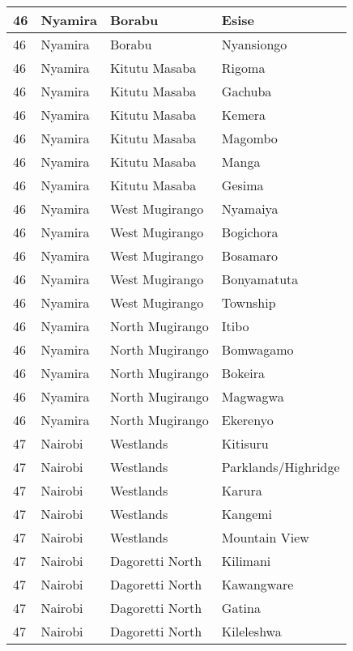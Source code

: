 \begin{table}[!ht]
\begin{tabular}{|l|l|l|l|}
        46 & Nyamira & Borabu & Esise \\ \hline
        46 & Nyamira & Borabu & Nyansiongo \\ \hline
        46 & Nyamira & Kitutu Masaba & Rigoma \\ \hline
        46 & Nyamira & Kitutu Masaba & Gachuba \\ \hline
        46 & Nyamira & Kitutu Masaba & Kemera \\ \hline
        46 & Nyamira & Kitutu Masaba & Magombo \\ \hline
        46 & Nyamira & Kitutu Masaba & Manga \\ \hline
        46 & Nyamira & Kitutu Masaba & Gesima \\ \hline
        46 & Nyamira & West Mugirango & Nyamaiya \\ \hline
        46 & Nyamira & West Mugirango & Bogichora \\ \hline
        46 & Nyamira & West Mugirango & Bosamaro \\ \hline
        46 & Nyamira & West Mugirango & Bonyamatuta \\ \hline
        46 & Nyamira & West Mugirango & Township \\ \hline
        46 & Nyamira & North Mugirango & Itibo \\ \hline
        46 & Nyamira & North Mugirango & Bomwagamo \\ \hline
        46 & Nyamira & North Mugirango & Bokeira \\ \hline
        46 & Nyamira & North Mugirango & Magwagwa \\ \hline
        46 & Nyamira & North Mugirango & Ekerenyo \\ \hline
        47 & Nairobi & Westlands & Kitisuru \\ \hline
        47 & Nairobi & Westlands & Parklands/Highridge \\ \hline
        47 & Nairobi & Westlands & Karura \\ \hline
        47 & Nairobi & Westlands & Kangemi \\ \hline
        47 & Nairobi & Westlands & Mountain View \\ \hline
        47 & Nairobi & Dagoretti North & Kilimani \\ \hline
        47 & Nairobi & Dagoretti North & Kawangware \\ \hline
        47 & Nairobi & Dagoretti North & Gatina \\ \hline
        47 & Nairobi & Dagoretti North & Kileleshwa \\ \hline

\end{tabular}
\end{table}
